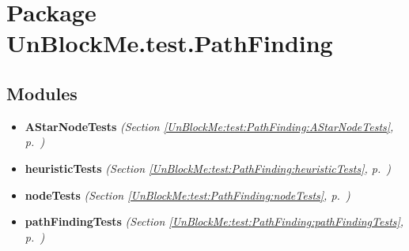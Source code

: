 %
%
%


\section{Package UnBlockMe.test.PathFinding}

    \label{UnBlockMe:test:PathFinding}


\subsection{Modules}

\begin{itemize}
\setlength{\parskip}{0ex}
\item \textbf{AStarNodeTests}
  \textit{(Section \ref{UnBlockMe:test:PathFinding:AStarNodeTests}, p.~\pageref{UnBlockMe:test:PathFinding:AStarNodeTests})}

\item \textbf{heuristicTests}
  \textit{(Section \ref{UnBlockMe:test:PathFinding:heuristicTests}, p.~\pageref{UnBlockMe:test:PathFinding:heuristicTests})}

\item \textbf{nodeTests}
  \textit{(Section \ref{UnBlockMe:test:PathFinding:nodeTests}, p.~\pageref{UnBlockMe:test:PathFinding:nodeTests})}

\item \textbf{pathFindingTests}
  \textit{(Section \ref{UnBlockMe:test:PathFinding:pathFindingTests}, p.~\pageref{UnBlockMe:test:PathFinding:pathFindingTests})}

\end{itemize}




